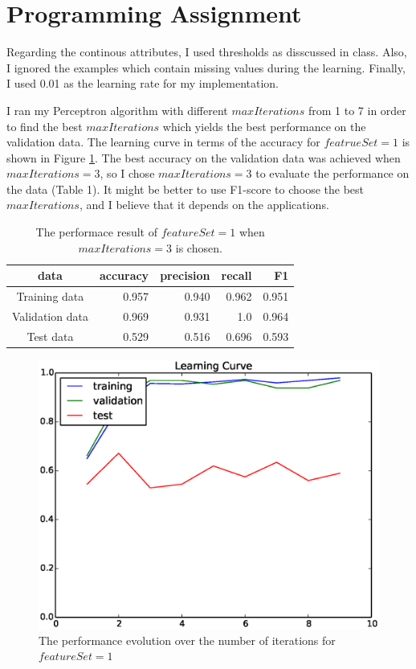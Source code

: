 \section{Programming Assignment}

Regarding the continous attributes, I used thresholds as disscussed in class. Also, I ignored the examples which contain missing values during the learning. Finally, I used 0.01 as the learning rate for my implementation. 

I ran my Perceptron algorithm with different $maxIterations$ from 1 to 7 in order to find the best $maxIterations$ which yields the best performance on the validation data. The learning curve in terms of the accuracy for $featrueSet=1$ is shown in Figure \ref{fig:learning_curve_1}.  The best accuracy on the validation data was achieved when $maxIterations=3$, so I chose $maxIterations = 3$ to evaluate the performance on the data (Table 1). It might be better to use F1-score to choose the best $maxIterations$, and I believe that it depends on the applications.

\begin{table}[htb]
\centering
  \begin{tabular}{|c|r|r|r|r|} \hline
    data & accuracy & precision & recall & F1 \\ \hline
    Training data & 0.957 & 0.940 & 0.962 & 0.951 \\ \hline
    Validation data & 0.969 & 0.931 & 1.0 & 0.964 \\ \hline
    Test data & 0.529 & 0.516 & 0.696 & 0.593 \\ \hline
  \end{tabular}
  \caption{The performace result of $featureSet = 1$ when $maxIterations = 3$ is chosen.}
\end{table}

\begin{figure}[hbtp]
\centering
\includegraphics[width=130mm]{learning_curve_1}
\caption{The performance evolution over the number of iterations for $featureSet=1$}
\label{fig:learning_curve_1}
\end{figure}

